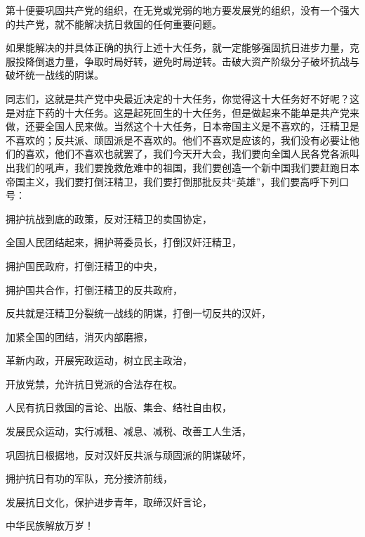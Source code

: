 第十便要巩固共产党的组织，在无党或党弱的地方要发展党的组织，没有一个强大的共产党，就不能解决抗日救国的任何重要问题。

如果能解决的并具体正确的执行上述十大任务，就一定能够强固抗日进步力量，克服投降倒退力量，争取时局好转，避免时局逆转。击破大资产阶级分子破坏抗战与破坏统一战线的阴谋。

同志们，这就是共产党中央最近决定的十大任务，你觉得这十大任务好不好呢？这是对症下药的十大任务。这是起死回生的十大任务，但是做起来不能单是共产党来做，还要全国人民来做。当然这个十大任务，日本帝国主义是不喜欢的，汪精卫是不喜欢的；反共派、顽固派是不喜欢的。他们不喜欢是应该的，我们没有必要让他们的喜欢，他们不喜欢也就罢了，我们今天开大会，我们要向全国人民各党各派叫出我们的吼声，我们要挽救危难中的祖国，我们要创造一个新中国我们要赶跑日本帝国主义，我们要打倒汪精卫，我们要打倒那批反共“英雄”，我们要高呼下列口号：

拥护抗战到底的政策，反对汪精卫的卖国协定，

全国人民团结起来，拥护蒋委员长，打倒汉奸汪精卫，

拥护国民政府，打倒汪精卫的中央，

拥护国共合作，打倒汪精卫的反共政府，

反共就是汪精卫分裂统一战线的阴谋，打倒一切反共的汉奸，

加紧全国的团结，消灭内部磨擦，

革新内政，开展宪政运动，树立民主政治，

开放党禁，允许抗日党派的合法存在权。

人民有抗日救国的言论、出版、集会、结社自由权，

发展民众运动，实行减租、减息、减税、改善工人生活，

巩固抗日根据地，反对汉奸反共派与顽固派的阴谋破坏，

拥护抗日有功的军队，充分接济前线，

发展抗日文化，保护进步青年，取缔汉奸言论，

中华民族解放万岁！

